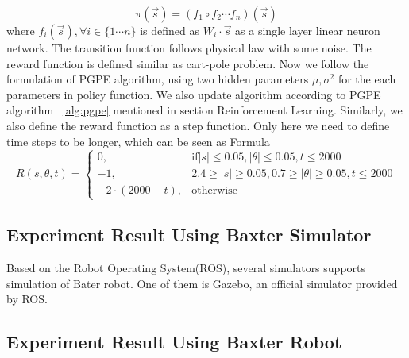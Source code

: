 \documentclass[officiallayout]{tktla}
\begin{document}
\begin{equation}
\pi(\vec{s}) = (f_1 \circ f_2 \cdots f_n)(\vec{s})
\end{equation} 
where $f_i(\vec{s}), \forall i \in \{1\cdots n\}$ is defined as $W_i \cdot \vec{s}$ as a single layer linear neuron network.
The transition function follows physical law with some noise. The reward function is defined similar as cart-pole problem.
Now we follow the formulation of PGPE algorithm, using two hidden parameters $\mu, \sigma^2$ for the each parameters in policy function. We also update algorithm according to PGPE algorithm ~\ref{alg:pgpe} mentioned in section Reinforcement Learning. Similarly, we also define the reward function as a step function. Only here we need to define time steps to be longer, which can be seen as Formula~
\begin{equation}
    R(s,\theta, t)= 
\begin{cases}
    0,				& \text{if} |s|\leq 0.05, |\theta| \leq 0.05, t \leq 2000\\
    -1,              & 2.4 \geq |s|\geq 0.05, 0.7 \geq |\theta| \geq 0.05, t \leq 2000 \\
    -2 \cdot (2000 - t), 		& \text{otherwise}
\end{cases}
\end{equation}

\subsection{Experiment Result Using Baxter Simulator}
Based on the Robot Operating System(ROS), several simulators supports simulation of Bater robot. One of them is Gazebo, an official simulator provided by ROS.
\subsection{Experiment Result Using Baxter Robot}





\end{document}
